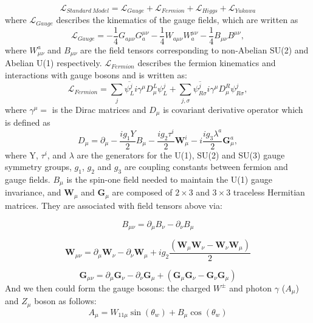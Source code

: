\begin{equation}
    \mathcal{L}_{Standard\ Model}= \mathcal{L}_{Gauge}+ \mathcal{L}_{Fermion}+ \mathcal{L}_{Higgs}+ \mathcal{L}_{Yukawa}
  \label{eq:Standard Modelall}
\end{equation}
where $\mathcal{L}_{Gauge}$ describes the kinematics of the gauge fields, which are written as
\begin{equation}
    \mathcal{L}_{Gauge}= -\frac{1}{4}G_{a\mu\nu}G^{\mu\nu}_a - \frac{1}{4}W_{a\mu\nu}W^{\mu\nu}_a - \frac{1}{4}B_{\mu\nu}B^{\mu\nu},
\end{equation}
where $W_{\mu\nu}^a$ and $B_{\mu\nu}$ are the field tensors corresponding to non-Abelian SU(2) and Abelian U(1) respectively.
$\mathcal{L}_{Fermion}$ describes the fermion kinematics and interactions with gauge bosons and is written as:
\begin{equation}
    \mathcal{L}_{Fermion}=\sum_j \overline{\psi^j_L}i\gamma^\mu D^L_\mu \psi^j_L + \sum_{j, \sigma} \overline{\psi^j_{R\sigma}}i\gamma^{\mu}D^R_{\mu}\psi^j_{R\sigma},
    \label{eq:smf}
\end{equation}
where $\gamma^{\mu}=$ is the Dirac matrices and $D_{\mu}$ is covariant derivative operator which is defined as 
\begin{equation}
    D_\mu=\partial_\mu-\frac{ig_1Y}{2}B_\mu-\frac{ig_2\tau^i}{2}\mathbf{W}^i_\mu-i\frac{ig_3\lambda^a}{2}\mathbf{G}^a_\mu,
    \label{eq:dirac}
\end{equation}
where Y, $\tau^i$, and $\lambda$ are the generators for the U(1), SU(2) and SU(3) gauge symmetry groups, $g_1$, $g_2$ and $g_3$ 
are coupling constants between fermion and gauge fields. 
$B_\mu$ is the spin-one field needed to maintain the U(1) gauge invariance,
and $\mathbf{W}_\mu$ and $\mathbf{G}_\mu$ are composed of $2\times3$ and $3\times3$ traceless Hermitian matrices.
They are associated with field tensors above via:

\begin{equation*}
  B_{\mu\nu}=\partial_\mu B_\nu-\partial_\nu B_\mu
\end{equation*}

\begin{equation*}
  \mathbf{W}_{\mu\nu}=\partial_\mu\mathbf{W}_\nu-\partial_\nu\mathbf{W}_\mu+ig_2\frac{\left(\mathbf{W}_\mu\mathbf{W}_\nu-\mathbf{W}_\nu\mathbf{W}_\mu\right)}{2}
\end{equation*}

\begin{equation*}
  \mathbf{G}_{\mu\nu}=\partial_\mu\mathbf{G}_\nu-\partial_\nu\mathbf{G}_\mu+\left(\mathbf{G}_\mu\mathbf{G}_\nu-\mathbf{G}_\nu\mathbf{G}_\mu\right)
\end{equation*}
And we then could form the gauge bosons: the charged $W^{\pm}$ and photon $\gamma$ ($A_\mu$) and $Z_\mu$ boson as follows:
\begin{equation*}
  A_\mu=W_{11\mu}\sin\left(\theta_w\right)+B_\mu\cos\left(\theta_w\right)
\end{equation*}

